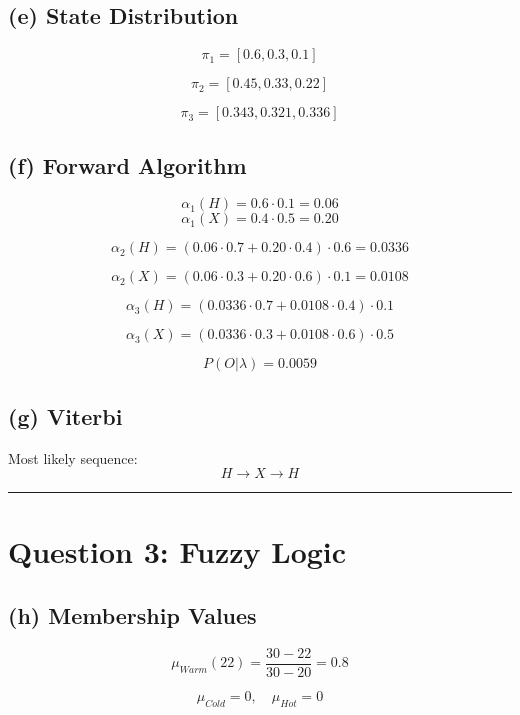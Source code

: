 \documentclass[12pt]{article}
\begin{document}
\subsection*{(e) State Distribution}

\[
\pi_1 = [0.6, 0.3, 0.1]
\]

\[
\pi_2 = [0.45, 0.33, 0.22]
\]

\[
\pi_3 = [0.343, 0.321, 0.336]
\]



\subsection*{(f) Forward Algorithm}

\[
\alpha_1(H)=0.6 \cdot 0.1 = 0.06
\]
\[
\alpha_1(X)=0.4 \cdot 0.5 = 0.20
\]

\[
\alpha_2(H) = (0.06 \cdot 0.7 + 0.20 \cdot 0.4)\cdot 0.6 = 0.0336
\]

\[
\alpha_2(X) = (0.06 \cdot 0.3 + 0.20 \cdot 0.6)\cdot 0.1 = 0.0108
\]

\[
\alpha_3(H) = (0.0336 \cdot 0.7 + 0.0108 \cdot 0.4)\cdot 0.1
\]

\[
\alpha_3(X) = (0.0336 \cdot 0.3 + 0.0108 \cdot 0.6)\cdot 0.5
\]

\[
P(O|\lambda) = 0.0059
\]



\subsection*{(g) Viterbi}

Most likely sequence:
\[
H \rightarrow X \rightarrow H
\]



\noindent\rule{\textwidth}{0.4pt}


\section*{Question 3: Fuzzy Logic}

\subsection*{(h) Membership Values}

\[
\mu_{Warm}(22) = \frac{30 - 22}{30 - 20} = 0.8
\]

\[
\mu_{Cold} = 0,\quad \mu_{Hot} = 0
\]
\end{document}
